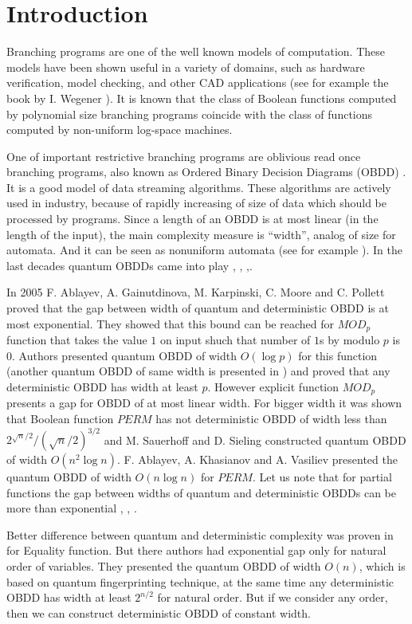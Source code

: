 \documentclass{llncs}
\begin{document}
\section{Introduction}
Branching programs are one of the well known models of computation. These models have been shown useful in a variety of domains, such as hardware verification, model checking, and other CAD applications (see for example the book by I. Wegener \cite{Weg00}). It is known that the class of Boolean  functions computed by polynomial size branching programs coincide with the class of functions computed by non-uniform log-space machines.

One of important restrictive branching programs are oblivious read once branching programs, also known as Ordered Binary Decision Diagrams (OBDD) \cite{Weg00}. It is a good model of data streaming algorithms. These algorithms are actively used in industry, because of rapidly increasing of size of data which should be processed by programs. Since a length of an OBDD is at most linear (in the length of the input), the main complexity measure is ``width'', analog of size for automata.
And it can be seen as nonuniform automata (see for example \cite{ag05}).  
In the last decades quantum OBDDs came into play \cite{agk01}, \cite{nhk00}, \cite{SS05},\cite{s06}.

In 2005 F. Ablayev, A. Gainutdinova, M. Karpinski, C. Moore and C. Pollett \cite{agkmp2005} proved that the gap between width of quantum and deterministic OBDD is at most exponential. They showed that this bound can be reached for $MOD_p$ function that takes the value $1$ on input shuch that number of $1$s by modulo $p$ is $0$. Authors presented quantum OBDD of width $O(\log p)$ for this function (another quantum OBDD of same width is presented in \cite{av2008}) and proved that any deterministic OBDD has width at least $p$.  However explicit function $MOD_p$ presents a gap for OBDD of at most linear width. For bigger width it was shown that Boolean function $PERM$ has not deterministic OBDD of width less than $2^{\sqrt{n}/2}/(\sqrt{n}/2)^{3/2}$ \cite{kmw91} and M. Sauerhoff and D. Sieling \cite{ss2005} constructed quantum OBDD of width $O(n^2\log n)$. F. Ablayev, A. Khasianov and A. Vasiliev \cite{akv2008} presented the quantum OBDD of width $O(n\log n)$ for $PERM$. Let us note that for partial functions the gap between widths of quantum and deterministic OBDDs can be more than exponential \cite{agky14}, \cite{g15}, \cite{agky16}.

Better difference between quantum and deterministic complexity was proven in \cite{akv2008} for Equality function. But there authors had exponential gap only for natural order of variables. They presented the quantum OBDD of width $O(n)$, which is based on quantum fingerprinting technique, at the same time any deterministic OBDD has width at least $2^{n/2}$ for natural order. But if we consider any order, then we can construct deterministic OBDD of constant width. 
\end{document}
